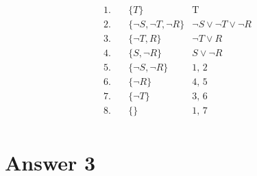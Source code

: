 \documentclass[12pt]{article}
\begin{document}
\begin{align*}
    1. \hspace{1em} & \{ T \}                                                                   & \text{T} \\
    2. \hspace{1em} & \{ \neg S, \neg T, \neg R \}                                              & \text{$\neg S \vee \neg T \vee \neg R$} \\
    3. \hspace{1em} & \{ \neg T, R \}                                                           & \text{$\neg T \vee R$} \\
    4. \hspace{1em} & \{ S, \neg R \}                                                           & \text{$S \vee \neg R$} \\
    5. \hspace{1em} & \{ \neg S, \neg R \}                                                      & \text{1, 2} \\
    6. \hspace{1em} & \{ \neg R \}                                                              & \text{4, 5} \\
    7. \hspace{1em} & \{ \neg T \}                                                              & \text{3, 6} \\
    8. \hspace{1em} & \{ \}                                                                     & \text{1, 7} \\
\end{align*}

\section*{Answer 3}
\end{document}
